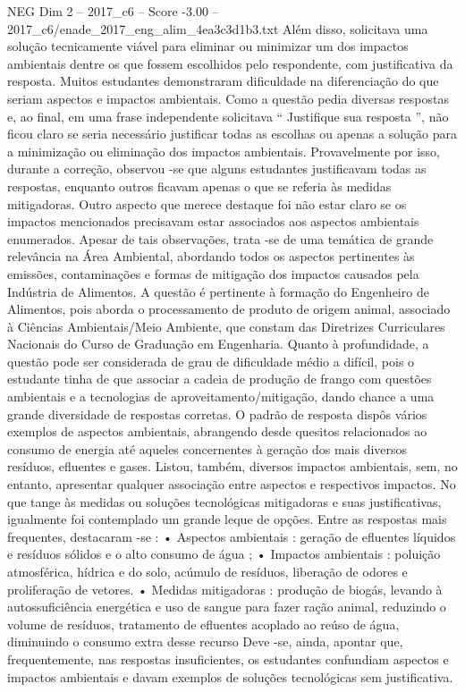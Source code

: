 \begin{textsample}{NEG Dim 2 – 2017\_c6 – Score -3.00 – 2017\_c6/enade\_2017\_eng\_alim\_4ea3c3d1b3.txt}
Além disso, solicitava uma solução tecnicamente viável para eliminar ou minimizar um dos impactos ambientais dentre os que fossem escolhidos pelo respondente, com justificativa da resposta.
Muitos estudantes demonstraram dificuldade na diferenciação do que seriam aspectos e impactos ambientais.
Como a questão pedia diversas respostas e, ao final, em uma frase independente solicitava “ Justifique sua resposta ”, não ficou claro se seria necessário justificar todas as escolhas ou apenas a solução para a minimização ou eliminação dos impactos ambientais.
Provavelmente por isso, durante a correção, observou -se que alguns estudantes justificavam todas as respostas, enquanto outros ficavam apenas o que se referia às medidas mitigadoras.
Outro aspecto que merece destaque foi não estar claro se os impactos mencionados precisavam estar associados aos aspectos ambientais enumerados.
Apesar de tais observações, trata -se de uma temática de grande relevância na Área Ambiental, abordando todos os aspectos pertinentes às emissões, contaminações e formas de mitigação dos impactos causados pela Indústria de Alimentos.
A questão é pertinente à formação do Engenheiro de Alimentos, pois aborda o processamento de produto de origem animal, associado à Ciências Ambientais/Meio Ambiente, que constam das Diretrizes Curriculares Nacionais do Curso de Graduação em Engenharia.
Quanto à profundidade, a questão pode ser considerada de grau de dificuldade médio a difícil, pois o estudante tinha de que associar a cadeia de produção de frango com questões ambientais e a tecnologias de aproveitamento/mitigação, dando chance a uma grande diversidade de respostas corretas.
O padrão de resposta dispôs vários exemplos de aspectos ambientais, abrangendo desde quesitos relacionados ao consumo de energia até aqueles concernentes à geração dos mais diversos resíduos, efluentes e gases.
Listou, também, diversos impactos ambientais, sem, no entanto, apresentar qualquer associação entre aspectos e respectivos impactos.
No que tange às medidas ou soluções tecnológicas mitigadoras e suas justificativas, igualmente foi contemplado um grande leque de opções.
Entre as respostas mais frequentes, destacaram -se : • Aspectos ambientais : geração de efluentes líquidos e resíduos sólidos e o alto consumo de água ; • Impactos ambientais : poluição atmosférica, hídrica e do solo, acúmulo de resíduos, liberação de odores e proliferação de vetores. • Medidas mitigadoras : produção de biogás, levando à autossuficiência energética e uso de sangue para fazer ração animal, reduzindo o volume de resíduos, tratamento de efluentes acoplado ao reúso de água, diminuindo o consumo extra desse recurso Deve -se, ainda, apontar que, frequentemente, nas respostas insuficientes, os estudantes confundiam aspectos e impactos ambientais e davam exemplos de soluções tecnológicas sem justificativa.

\end{textsample}

